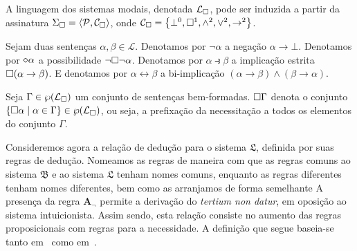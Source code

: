     \vspace{.5\baselineskip}
    \begin{tcolorbox}[enhanced jigsaw, breakable, sharp corners, colframe=black, colback=white, boxrule=0.5pt, left=1.5mm, right=1.5mm, top=1.5mm, bottom=1.5mm]
    \begin{definition}\label{modal.language}
        A linguagem dos sistemas modais, denotada $\mathcal{L}_{\Box}$, pode ser induzida a partir da assinatura $\Sigma_{\Box}=\langle\mathcal{P},\mathcal{C}_{\Box}\rangle$, onde $\mathcal{C}_{\Box}=\left\{\bot^0,\Box^1,\wedge^2,\vee^2,\to^2\right\}$.
    \end{definition}
    \end{tcolorbox}

    \begin{tcolorbox}[enhanced jigsaw, breakable, sharp corners, colframe=black, colback=white, boxrule=0.5pt, left=1.5mm, right=1.5mm, top=1.5mm, bottom=1.5mm]
    \begin{notation}
        Sejam duas sentenças $\alpha,\beta\in\mathcal{L}$.
        Denotamos por $\neg\alpha$ a negação $\alpha\to\bot$.
        Denotamos por $\pos\alpha$ a possibilidade $\neg\Box\neg\alpha$.
        Denotamos por $\alpha\strictif\beta$ a implicação estrita $\Box(\alpha\to\beta)$.
        E denotamos por $\alpha\leftrightarrow\beta$ a bi-implicação $(\alpha\to\beta)\wedge(\beta\to\alpha)$.
    \end{notation}
    \end{tcolorbox}

    \begin{tcolorbox}[enhanced jigsaw, breakable, sharp corners, colframe=black, colback=white, boxrule=0.5pt, left=1.5mm, right=1.5mm, top=1.5mm, bottom=1.5mm]
    \begin{notation}
        Seja $\Gamma\in\wp(\mathcal{L}_{\Box})$ um conjunto de sentenças bem-formadas.
        $\Box\Gamma$ denota o conjunto $\left\{\Box\alpha\mid\alpha\in\Gamma\right\}\in\wp(\mathcal{L}_{\Box})$, ou seja, a prefixação da necessitação a todos os elementos do conjunto $\Gamma$.
    \end{notation}
    \end{tcolorbox}

\vspace{.5\baselineskip}
    Consideremos agora a relação de dedução para o sistema $\mathfrak{L}$, definida por suas regras de dedução.
    Nomeamos as regras de maneira com que as regras comuns ao sistema $\mathfrak{B}$ e ao sistema $\mathfrak{L}$ tenham nomes comuns, enquanto as regras diferentes tenham nomes diferentes, bem como as arranjamos de forma semelhante
    A presença da regra $\mathbf{A_\neg}$ permite a derivação do \emph{tertium non datur}, em oposição ao sistema intuicionista.
    Assim sendo, esta relação consiste no aumento das regras proposicionais com regras para a necessidade.
    A definição que segue baseia-se tanto em~\cite{Troelstra} como em~\cite{Hakli}.

